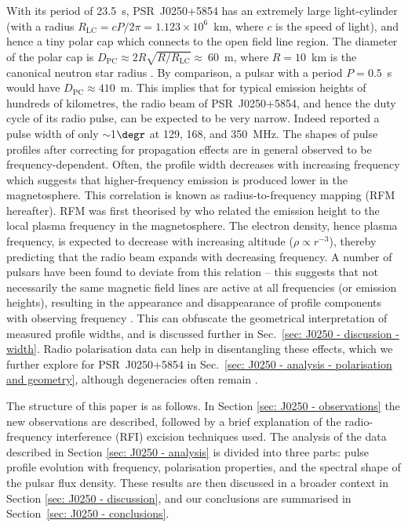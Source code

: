 With its period of 23.5~s, PSR~J0250+5854 has an extremely large light-cylinder (with a radius $R_\mathrm{LC} = cP/2\pi =  1.123\times10^{6}$~km, where $c$ is the speed of light), and hence a tiny polar cap which connects to the open field line region. The diameter of the polar cap is $D_\mathrm{PC} \approx 2R\sqrt{R/R_\mathrm{LC}} \approx~60$~m, where $R = 10$~km is the canonical neutron star radius \citep[e.g.][]{Sxxx1971}. By comparison, a pulsar with a period $P = 0.5$~s would have $D_\mathrm{PC} \approx 410$~m. This implies that for typical emission heights of hundreds of kilometres, the radio beam of PSR~J0250+5854, and hence the duty cycle of its radio pulse, can be expected to be very narrow. Indeed \citet{TBC+2018} reported a pulse width of only $\sim$1$\degr$ at 129, 168, and 350~MHz. The shapes of pulse profiles after correcting for propagation effects are in general observed to be frequency-dependent. Often, the profile width decreases with increasing frequency which suggests that higher-frequency emission is produced lower in the magnetosphere. This correlation is known as radius-to-frequency mapping (RFM hereafter). RFM was first theorised by \citet{RSxx1975} who related the emission height to the local plasma frequency in the magnetosphere. The electron density, hence plasma frequency, is expected to decrease with increasing altitude ($\rho \propto r^{-3}$), thereby predicting that the radio beam expands with decreasing frequency. A number of pulsars have been found to deviate from this relation \citep[e.g.][]{Txxx1991, CWxx2014, PHS+2016} -- this suggests that not necessarily the same magnetic field lines are active at all frequencies (or emission heights), resulting in the appearance and disappearance of profile components with observing frequency \citep[e.g.][]{Cxxx1978, MRxx2002}. This can obfuscate the geometrical interpretation of measured profile widths, and is discussed further in Sec.~\ref{sec: J0250 - discussion - width}. Radio polarisation data can help in disentangling these effects, which we further explore for PSR~J0250+5854 in Sec.~\ref{sec: J0250 - analysis - polarisation and geometry}, although degeneracies often remain \citep[e.g.][]{KJW+2010}.

The structure of this paper is as follows. In Section \ref{sec: J0250 - observations} the new observations are described, followed by a brief explanation of the radio-frequency interference (RFI) excision techniques used. The analysis of the data described in Section \ref{sec: J0250 - analysis} is divided into three parts: pulse profile evolution with frequency, polarisation properties, and the spectral shape of the pulsar flux density. These results are then discussed in a broader context in Section \ref{sec: J0250 - discussion}, and our conclusions are summarised in Section~\ref{sec: J0250 - conclusions}.


